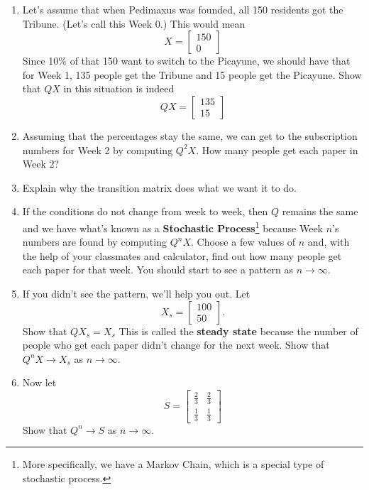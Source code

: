 \begin{enumerate}
\setcounter{enumi}{\value{HW}}

\item \label{MCfirst} Let's assume that when Pedimaxus was founded, all 150 residents got the Tribune.  (Let's call this Week 0.) This would mean \[X = \left[ \begin{array}{r} 150 \\ 0 \end{array} \right]\] Since 10\% of that 150 want to switch to the Picayune, we should have that for Week 1, 135 people get the Tribune and 15 people get the Picayune.  Show that $QX$ in this situation is indeed \[QX = \left[ \begin{array}{r} 135 \\ 15 \end{array} \right]\]

\item Assuming that the percentages stay the same, we can get to the subscription numbers for Week 2 by computing $Q^{2}X$. How many people get each paper in Week 2?

\item Explain why the transition matrix does what we want it to do.

\item If the conditions do not change from week to week, then $Q$ remains the same and we have what's known as a   {\bf Stochastic Process}\footnote{More specifically, we have a Markov Chain, which is a special type of stochastic process.} because Week $n$'s numbers are found by computing $Q^{n}X$.  Choose a few values of $n$ and, with the help of your classmates and calculator, find out how many people get each paper for that week.  You should start to see a pattern as $n \rightarrow \infty$.

\item If you didn't see the pattern, we'll help you out.  Let \[X_{s} = \left[ \begin{array}{r} 100 \\ 50 \end{array} \right].\]  Show that $QX_{s} = X_{s}$  This is called the {\bf steady state}  because the number of people who get each paper didn't change for the next week.  Show that $Q^{n}X \rightarrow X_{s}$ as $n \rightarrow \infty$. 

\item Now let \[S = \left[ \begin{array}{rr} \frac{2}{3} & \frac{2}{3} \\ [3pt] \frac{1}{3} & \frac{1}{3} \end{array} \right]\]  Show that $Q^{n} \rightarrow S$ as $n \rightarrow \infty$.  


\end{enumerate}

